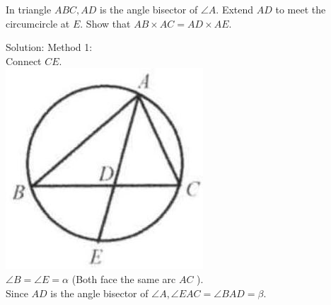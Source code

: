 \documentclass{article}
\begin{document}
In triangle \(A B C, A D\) is the angle bisector of \(\angle A\). Extend \(A D\) to meet the circumcircle at \(E\). Show that \(A B \times A C=A D \times A E\).

Solution:
Method 1:\\
Connect \(C E\).\\
\centering
\includegraphics[width=\textwidth]{images/165(1).jpg}\\
\(\angle B=\angle E=\alpha\) (Both face the same arc \(A C\) ).\\
Since \(A D\) is the angle bisector of \(\angle A, \angle E A C=\angle B A D=\beta\).
\end{document}
